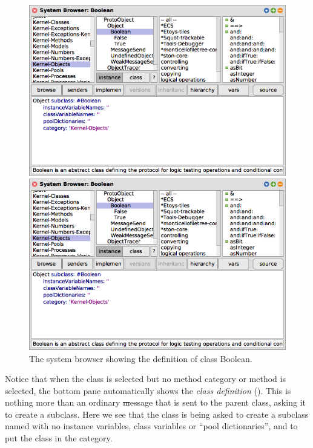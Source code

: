 \documentclass[a4paper,10pt,twoside]{book}
\begin{document}

\begin{figure}[hbt]
\ifluluelse
	{\centerline {\includegraphics[width=\textwidth]{Kernel-objects-boolean}}}
	{\centerline {\includegraphics[scale=0.7]{Kernel-objects-boolean}}}
\caption{The system browser showing the definition of class Boolean.
\label{fig:browseBoolean}}
\end{figure}

Notice that when the  class is selected but no method category or method is selected, the bottom pane automatically shows the \emph{class definition}
().
This is nothing more than an ordinary \st message that is sent to the parent class, asking it to create a subclass.
Here we see that the class  is being asked to create a subclass named  with no instance variables, class variables or ``pool dictionaries'', and to put the class  in the  category.
\end{document}
